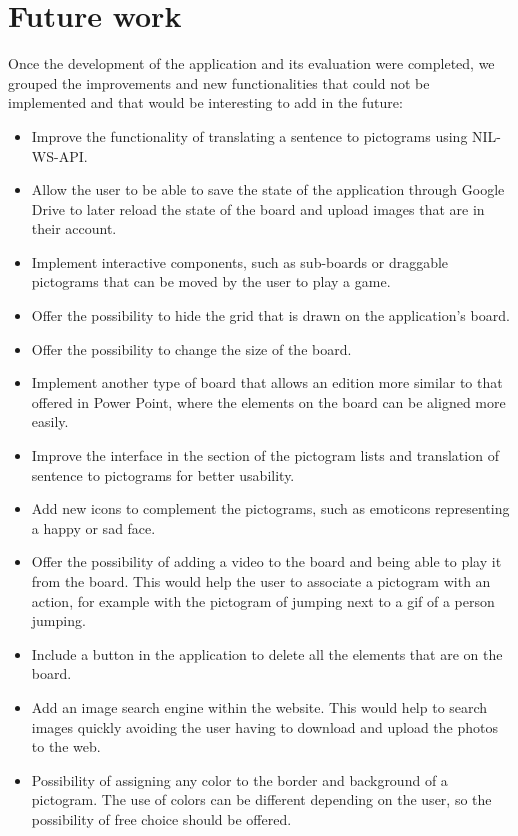 \section{Future work}

Once the development of the application and its evaluation were completed, we grouped the improvements and new functionalities that could not be implemented and that would be interesting to add in the future: 

\begin{itemize}
	\item Improve the functionality of translating a sentence to pictograms using NIL-WS-API.
	\item Allow the user to be able to save the state of the application through Google Drive to later reload the state of the board and upload images that are in their account.
	\item Implement interactive components, such as sub-boards or draggable pictograms that can be moved by the user to play a game.
	\item Offer the possibility to hide the grid that is drawn on the application's board.
	\item Offer the possibility to change the size of the board.
	\item Implement another type of board that allows an edition more similar to that offered in Power Point, where the elements on the board can be aligned more easily.  
	
	\item Improve the interface in the section of the pictogram lists and translation of sentence to pictograms for better usability.
	
	\item Add new icons to complement the pictograms, such as emoticons representing a happy or sad face.
	
	\item Offer the possibility of adding a video to the board and being able to play it from the board. This would help the user to associate a pictogram with an action, for example with the pictogram of jumping next to a gif of a person jumping.
	
	\item Include a button in the application to delete all the elements that are on the board.
	
	\item Add an image search engine within the website. This would help to search images quickly avoiding the user having to download and upload the photos to the web. 
	
	\item Possibility of assigning any color to the border and background of a pictogram. The use of colors can be different depending on the user, so the possibility of free choice should be offered. 
	
\end{itemize}








